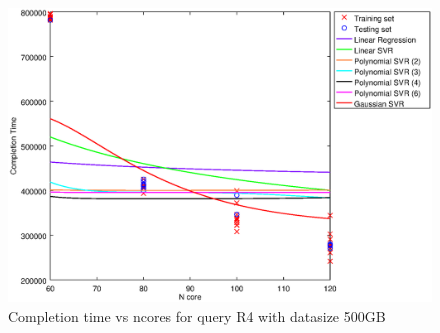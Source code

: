 
\begin {figure}[hbtp]
\centering
\includegraphics[width=\textwidth]{output/R4_500_1_OVER_NCORES/plot_R4_500.eps}
\caption{Completion time vs ncores for query R4 with datasize 500GB}
\label{fig:all_nonlinear_R4_500}
\end {figure}
